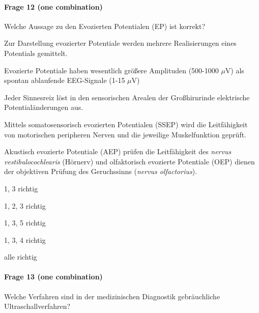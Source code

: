\paragraph{Frage 12 (one combination)}

Welche Aussage zu den Evozierten Potentialen (EP) ist korrekt?

\begin{minipage}{.7\linewidth}
  \begin{benumerate}
    \item Zur Darstellung evozierter Potentiale werden mehrere Realisierungen eines Potentials gemittelt.
    \item Evozierte Potentiale haben wesentlich größere Amplituden (500-1000 \( \mu \)V) als spontan ablaufende EEG-Signale (1-15 \( \mu \)V)
    \item Jeder Sinnesreiz löst in den sensorischen Arealen der Großhirnrinde elektrische Potentialänderungen aus.
    \item Mittels somatosensorisch evozierten Potentialen (SSEP) wird die Leitfähigkeit von motorischen peripheren Nerven und die jeweilige Muskelfunktion geprüft.
    \item Akustisch evozierte Potentiale (AEP) prüfen die Leitfähigkeit des \emph{nervus vestibulocochlearis} (Hörnerv) und olfaktorisch evozierte Potentiale (OEP) dienen der objektiven Prüfung des Geruchssinns (\emph{nervus olfactorius}).
  \end{benumerate}
\end{minipage}%
\begin{minipage}{.25\linewidth}
  \begin{checklist}[leftmargin=7mm]
    \item 1, 3 richtig
    \item 1, 2, 3 richtig
    \item[\checkedbox] 1, 3, 5 richtig
    \item 1, 3, 4 richtig
    \item alle richtig
  \end{checklist}
\end{minipage}

\paragraph{Frage 13 (one combination)}

Welche Verfahren sind in der medizinischen Diagnostik gebräuchliche Ultraschallverfahren?

